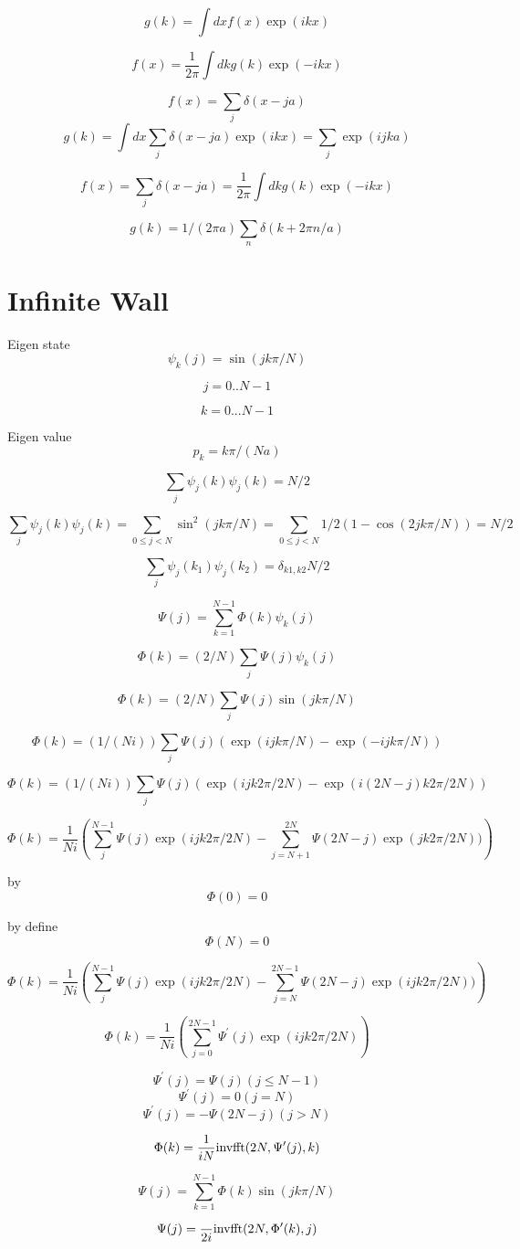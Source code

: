 \documentclass[12pt,twoside]{article}
\begin{document}
$$
g(k) = \int dx f(x) \exp(ikx)
$$

$$
f(x) = \frac{1}{2\pi}\int dk g(k) \exp(-ikx)
$$

$$
f(x) = \sum_j \delta(x - ja)
$$
$$
g(k) = \int dx \sum_j \delta(x - ja) \exp(ikx) = \sum_j \exp(ijka)
$$

$$
f(x) = \sum_j \delta(x - ja) = \frac{1}{2\pi}\int dk g(k) \exp(-ikx)
$$

$$
g(k) = 1/(2\pi a)\sum_n \delta(k+2\pi n/a)
$$


\section{Infinite Wall}

Eigen state
$$
\psi_k(j) = \sin(jk\pi/N)
$$

$$
j=0..N-1
$$

$$
k=0...N-1
$$

Eigen value
$$
p_k = k\pi/(N a)
$$

$$
\sum_j \psi_j(k)\psi_j(k) = N/2
$$

$$
\sum_j \psi_j(k)\psi_j(k) = 
\sum_{0 \le j<N}\sin^2(jk\pi/N)
=\sum_{0\le j<N}1/2(1-\cos(2jk\pi/N))
=N/2
$$

$$
\sum_j \psi_j(k_1)\psi_j(k_2) = \delta_{k1,k2} N/2
$$


$$
\Psi(j) = \sum_{k=1}^{N-1} \Phi(k) \psi_k(j)
$$

$$
\Phi(k) = (2/N) \sum_j \Psi(j) \psi_k(j)
$$

$$
\Phi(k) = (2/N) \sum_j \Psi(j) \sin(jk\pi/N)
$$

$$
\Phi(k) = (1/(Ni)) \sum_j \Psi(j) (\exp(ijk\pi/N) - \exp(-ijk\pi/N))
$$

$$
\Phi(k) = (1/(Ni)) \sum_j \Psi(j) (\exp(ijk2\pi/2N) - \exp(i(2N-j)k2\pi/2N))
$$

$$
\Phi(k) = \frac{1}{Ni}\left(\sum_j^{N-1} \Psi(j)\exp(ijk2\pi/2N) - \sum_{j=N+1}^{2N} \Psi(2N-j)\exp(jk2\pi/2N))\right)
$$

by
$$
\Phi(0)=0
$$

by define
$$
\Phi(N)=0
$$

$$
\Phi(k) = \frac{1}{Ni}\left(\sum_j^{N-1} \Psi(j)\exp(ijk2\pi/2N) - \sum_{j=N}^{2N-1} \Psi(2N-j)\exp(ijk2\pi/2N))\right)
$$

$$
\Phi(k) = \frac{1}{Ni}\left(\sum_{j=0}^{2N-1} \Psi^\prime(j)\exp(ijk2\pi/2N)\right)
$$

$$
\Psi^\prime(j) = \Psi(j) (j \le N-1)
$$
$$
\Psi^\prime(j) = 0 (j = N)
$$
$$
\Psi^\prime(j) = -\Psi(2N-j) (j > N)
$$

$$
\Phi(k) = \frac{1}{iN} {\rm inv fft}(2N, \Psi^\prime(j), k)
$$


$$
\Psi(j) = \sum_{k=1}^{N-1} \Phi(k) \sin(jk\pi/N)
$$

$$
\Psi(j) = \frac{}{2i} {\rm inv fft}(2N, \Phi^\prime(k), j)
$$
\end{document}
